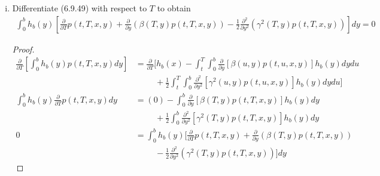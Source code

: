 \documentclass{article}
\theoremstyle{definition}
\theoremstyle{definition}
\begin{document}
\begin{enumerate}
\begin{enumerate}[(i)]
\begin{proof}
\begin{align*}
    \end{align*}
    We make the substitutions into (6.9.48) to obtain
    \begin{align*}
        \int_0^b h_b(y) p(t,T,x,y) dy &= h_b(x) - \int_t^T \int_0^b \frac{\partial}{\partial y} \left[ \beta(u,y)p(t,u,x,y) \right] h_b(y) dy du  \notag \\
        & \hspace{1cm} + \frac{1}{2}\int_t^T \int_0^b  \frac{\partial^2}{\partial y^2} \left[ \gamma^2(u,y) p(t,u,x,y)\right] h_b(y) dy du
    \end{align*}
    \end{proof}
    
    

    
    
    \item Differentiate (6.9.49) with respect to $T$ to obtain
    \begin{align}
        \int_0^b h_b(y) \left[ \frac{\partial }{\partial T} p(t,T,x,y) + \frac{\partial }{\partial y} \left( \beta(T,y) p(t,T,x,y) \right) - \frac{1}{2}\frac{\partial^2}{\partial y^2} \left( \gamma^2(T,y) p(t,T,x,y)\right) \right] dy=0 \tag{6.9.50}
    \end{align}
    \begin{proof}    
    \begin{align*}
        \frac{\partial }{\partial T} \left[ \int_0^b h_b(y) p(t,T,x,y) dy \right] &=  \frac{\partial }{\partial T} \bigg[ h_b(x) - \int_t^T \int_0^b \frac{\partial}{\partial y} \left[ \beta(u,y)p(t,u,x,y) \right] h_b(y) dy du \\
        & \hspace{1cm} + \frac{1}{2}\int_t^T \int_0^b  \frac{\partial^2}{\partial y^2} \left[ \gamma^2(u,y) p(t,u,x,y)\right] h_b(y) dy du \bigg] \\
    \int_0^b h_b(y)  \frac{\partial }{\partial T} p(t,T,x,y) dy  &=   (0) -  \int_0^b \frac{\partial}{\partial y} \left[ \beta(T,y)p(t,T,x,y) \right] h_b(y) dy  \\
        & \hspace{1cm} + \frac{1}{2}\int_0^b  \frac{\partial^2}{\partial y^2} \left[ \gamma^2(T,y) p(t,T,x,y)\right] h_b(y) dy  \\
    0&=\int_0^b h_b(y) \bigg[\frac{\partial }{\partial T} p(t,T,x,y) + \frac{\partial }{\partial y} \left( \beta(T,y) p(t,T,x,y) \right) \\
    &\hspace{1cm}- \frac{1}{2}\frac{\partial^2}{\partial y^2} \left( \gamma^2(T,y) p(t,T,x,y)\right)  \bigg]dy

\end{align*}
\end{proof}
\end{enumerate}
\end{enumerate}
\end{document}
